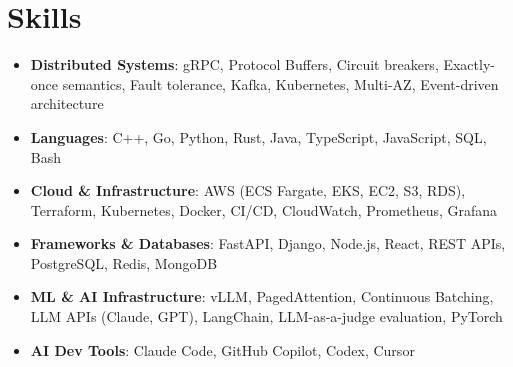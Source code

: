 \documentclass[letterpaper,11pt]{article}
\newcommand{\resumeSubHeadingListStart}{\begin{itemize}[leftmargin=0.15in, label={}]}
\newcommand{\resumeSubHeadingListEnd}{\end{itemize}}
\newcommand{\resumeSkillHeading}[2]{%
  \item\small{\textbf{#1}: #2 \vspace{-9pt}}%
}
\begin{document}
\section{Skills}
  \resumeSubHeadingListStart
    \resumeSkillHeading{Distributed Systems}{gRPC, Protocol Buffers, Circuit breakers, Exactly-once semantics, Fault tolerance, Kafka, Kubernetes, Multi-AZ, Event-driven architecture}
    \resumeSkillHeading{Languages}{C++, Go, Python, Rust, Java, TypeScript, JavaScript, SQL, Bash}
    \resumeSkillHeading{Cloud \& Infrastructure}{AWS (ECS Fargate, EKS, EC2, S3, RDS), Terraform, Kubernetes, Docker, CI/CD, CloudWatch, Prometheus, Grafana}
    \resumeSkillHeading{Frameworks \& Databases}{FastAPI, Django, Node.js, React, REST APIs, PostgreSQL, Redis, MongoDB}
    \resumeSkillHeading{ML \& AI Infrastructure}{vLLM, PagedAttention, Continuous Batching, LLM APIs (Claude, GPT), LangChain, LLM-as-a-judge evaluation, PyTorch}
    \resumeSkillHeading{AI Dev Tools}{Claude Code, GitHub Copilot, Codex, Cursor}
  \resumeSubHeadingListEnd
\end{document}
